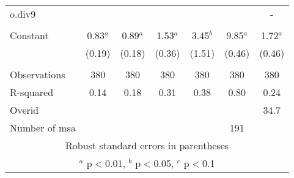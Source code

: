 \documentclass[]{article}
\begin{document}
\begin{tabular}{lcccccc}
o.div9 &  &  &  &  &  & - \\
 &  &  &  &  &  &  \\
Constant & 0.83$^a$ & 0.89$^a$ & 1.53$^a$ & 3.45$^b$ & 9.85$^a$ & 1.72$^a$ \\
 & (0.19) & (0.18) & (0.36) & (1.51) & (0.46) & (0.46) \\
 &  &  &  &  &  &  \\
Observations & 380 & 380 & 380 & 380 & 380 & 380 \\
R-squared & 0.14 & 0.18 & 0.31 & 0.38 & 0.80 & 0.24 \\
Overid &  &  &  &  &  & 34.7 \\
 Number of msa &  &  &  &  & 191 &  \\ \hline
\multicolumn{7}{c}{ Robust standard errors in parentheses} \\
\multicolumn{7}{c}{ $^a$ p$<$0.01, $^b$ p$<$0.05, $^c$ p$<$0.1} \\
\end{tabular}
\end{document}
